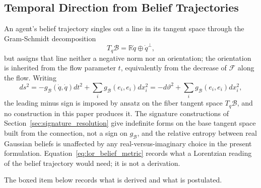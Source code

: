 \subsection{Temporal Direction from Belief Trajectories}

An agent's belief trajectory singles out a line in its tangent space through the Gram-Schmidt decomposition
\begin{equation}
T_q\mathcal{B} = \mathbb{R}\dot{q} \oplus \dot{q}^\perp,
\label{eq:tangent_decomp}
\end{equation}
but assigns that line neither a negative norm nor an orientation; the orientation is inherited from the flow parameter $t$, equivalently from the decrease of $\mathcal{F}$ along the flow. Writing
\begin{equation}
ds^2 = -g_{\mathcal{B}}(\dot{q}, \dot{q}) dt^2 + \sum_i g_{\mathcal{B}}(e_i, e_i) dx_i^2 = -d\vartheta^2 + \sum_i g_{\mathcal{B}}(e_i, e_i) dx_i^2,
\label{eq:lor_belief_metric}
\end{equation}
the leading minus sign is imposed by ansatz on the fiber tangent space $T_q\mathcal{B}$, and no construction in this paper produces it. The signature constructions of Section~\ref{sec:signature_resolution} give indefinite forms on the base tangent space built from the connection, not a sign on $g_{\mathcal{B}}$, and the relative entropy between real Gaussian beliefs is unaffected by any real-versus-imaginary choice in the present formulation. Equation~\eqref{eq:lor_belief_metric} records what a Lorentzian reading of the belief trajectory would need; it is not a derivation.

The boxed item below records what is derived and what is postulated.

